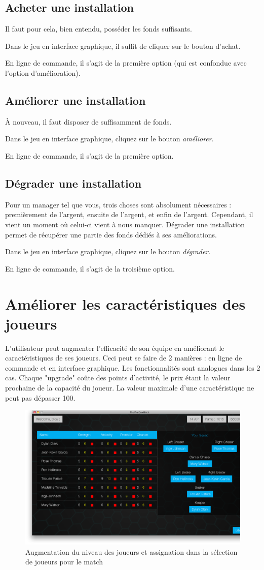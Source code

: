 \subsection{Acheter une installation}
Il faut pour cela, bien entendu, posséder les fonds suffisants.

Dans le jeu en interface graphique, il suffit de cliquer sur le bouton d'achat.

En ligne de commande, il s'agit de la première option (qui est confondue avec l'option d'amélioration).

\subsection{Améliorer une installation}
À nouveau, il faut disposer de suffisamment de fonds.

Dans le jeu en interface graphique, cliquez sur le bouton \emph{améliorer}.

En ligne de commande, il s'agit de la première option.

\subsection{Dégrader une installation}
Pour un manager tel que vous, trois choses sont absolument nécessaires : premièrement de l'argent,
ensuite de l'argent, et enfin de l'argent. Cependant, il vient un moment où celui-ci vient à nous 
manquer. Dégrader une installation permet de récupérer une partie des fonds dédiés à ses améliorations.

Dans le jeu en interface graphique, cliquez sur le bouton \emph{dégrader}.

En ligne de commande, il s'agit de la troisième option.

\section{Améliorer les caractéristiques des joueurs}
L'utilisateur peut augmenter l'efficacité de son équipe en améliorant le caractéristiques de ses joueurs. Ceci peut se faire de 2 manières : en ligne de commande et en interface graphique.
Les fonctionnalités sont analogues dans les 2 cas. Chaque "upgrade" coûte des points d'activité, le prix étant la valeur prochaine de la capacité du joueur. 
La valeur maximale d'une caractéristique ne peut pas dépasser  100.

\begin{figure}[h!]
    \centering
    \includegraphics[width=\textwidth]{../screenshots/player_upgrade.png}
    \caption{\label{manual:player_upgrade} Augmentation du niveau des joueurs et assignation dans la sélection de joueurs pour le match}
\end{figure}

